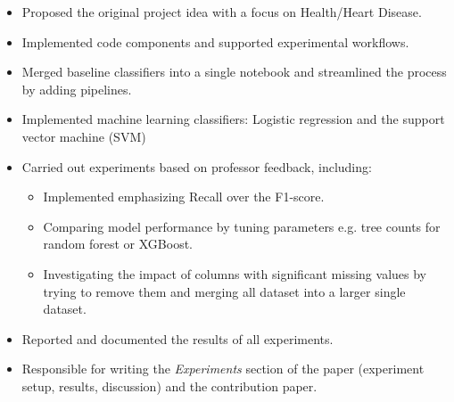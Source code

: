 \documentclass[11pt,a4paper]{article}
\begin{document}
\begin{itemize}[leftmargin=1.5em]
    \item Proposed the original project idea with a focus on Health/Heart Disease.
    \item Implemented code components and supported experimental workflows.
    \item Merged baseline classifiers into a single notebook and streamlined the process by adding pipelines.
    \item Implemented machine learning classifiers: Logistic regression and the support vector machine (SVM)
    \item Carried out experiments based on professor feedback, including:
    \begin{itemize}
        \item Implemented emphasizing Recall over the F1-score.
        \item Comparing model performance by tuning parameters e.g. tree counts for random forest or XGBoost.
        \item Investigating the impact of columns with significant missing values by trying to remove them and merging all dataset into a larger single dataset.
    \end{itemize}
    \item Reported and documented the results of all experiments.
    \item Responsible for writing the \textit{Experiments} section of the paper (experiment setup, results, discussion) and the contribution paper.
\end{itemize}
\end{document}
